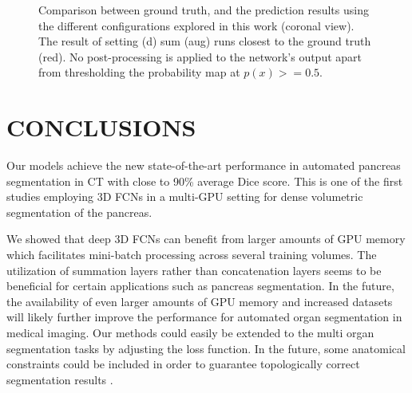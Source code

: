 \documentclass[a4paper]{spie}  %
\begin{document}
\begin{figure}[tb]
	\centering
	\hfill
	\hfill
	\hfill
	\vspace{1em}

	\hfill
	\hfill
	\hfill

	\vspace{1em}
	\caption{Comparison between ground truth, and the prediction results using the different configurations explored in this work (coronal view). The result of setting (d) sum (aug) runs closest to the ground truth (red). No post-processing is applied to the network's output apart from thresholding the probability map at $p(x)>=0.5$.
	\label{fig:comparison}}
\end{figure}
\section{CONCLUSIONS}
Our models achieve the new state-of-the-art performance in automated pancreas segmentation in CT with close to 90\% average Dice score. This is one of the first studies employing 3D FCNs in a multi-GPU setting for dense volumetric segmentation of the pancreas.

We showed that deep 3D FCNs can benefit from larger amounts of GPU memory which facilitates mini-batch processing across several training volumes. The utilization of summation layers rather than concatenation layers seems to be beneficial for certain applications such as pancreas segmentation. In the future, the availability of even larger amounts of GPU memory and increased datasets will likely further improve the performance for automated organ segmentation in medical imaging. Our methods could easily be extended to the multi organ segmentation tasks by adjusting the loss function. In the future, some anatomical constraints could be included in order to guarantee topologically correct segmentation results \cite{oktay2017anatomically}.
\acknowledgments
\end{document}

